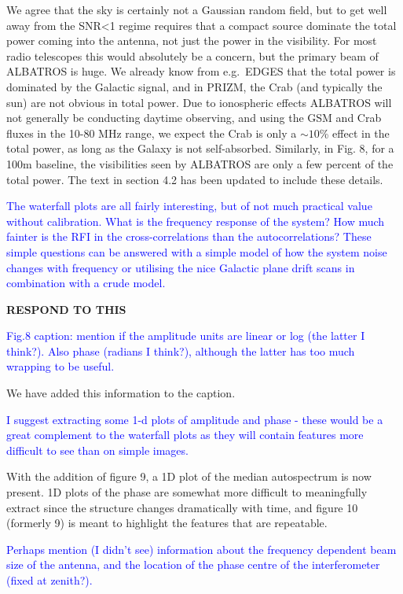 \documentclass[11pt]{article}
\begin{document}
We agree that the sky is certainly not a Gaussian random field, but to
get well away from the SNR<1 regime requires that a compact source
dominate the total power coming into the antenna, not just the power
in the visibility.  For most radio telescopes this would absolutely be
a concern, but the primary beam of ALBATROS is huge.  We already know
from e.g.\ EDGES that the total power is dominated by the Galactic
signal, and in PRIZM, the Crab (and typically the sun) are not obvious
in total power.  Due to ionospheric effects ALBATROS will not
generally be conducting daytime observing, and using the GSM and Crab
fluxes in the 10-80 MHz range, we expect the Crab is only a $\sim10$\%
effect in the total power, as long as the Galaxy is not self-absorbed.
Similarly, in Fig. 8, for a 100m baseline, the visibilities seen by
ALBATROS are only a few percent of the total power.  The text in
section 4.2 has been updated to include these details.

\noindent \textcolor{blue}{The waterfall plots are all fairly
  interesting, but of not much practical value without
  calibration. What is the frequency response of the system? How much
  fainter is the RFI in the cross-correlations than the
  autocorrelations? These simple questions can be answered with a
  simple model of how the system noise changes with frequency or
  utilising the nice Galactic plane drift scans in combination with a
  crude model.}

{\bf RESPOND TO THIS}

\noindent \textcolor{blue}{Fig.8 caption: mention if the amplitude
  units are linear or log (the latter I think?). Also phase (radians I
  think?), although the latter has too much wrapping to be useful.}

We have added this information to the caption.

\noindent \textcolor{blue}{I suggest extracting some 1-d plots of
  amplitude and phase - these would be a great complement to the
  waterfall plots as they will contain features more difficult to see
  than on simple images.}

With the addition of figure 9, a 1D plot of the median autospectrum is
now present.  1D plots of the phase are somewhat more difficult to
meaningfully extract since the structure changes dramatically with
time, and figure 10 (formerly 9) is meant to highlight the features
that are repeatable.

\noindent \textcolor{blue}{Perhaps mention (I didn't see) information
  about the frequency dependent beam size of the antenna, and the
  location of the phase centre of the interferometer (fixed at
  zenith?).}
\end{document}
